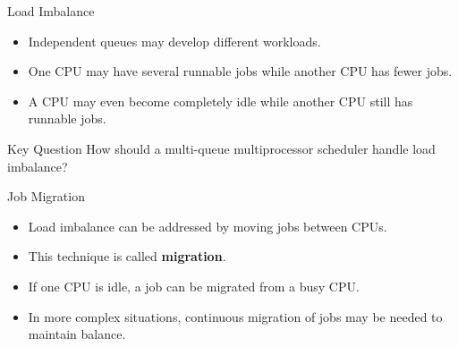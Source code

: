 \begin{frame}{Load Imbalance}

\begin{itemize}
    \item Independent queues may develop different workloads.

    \item One CPU may have several runnable jobs while another CPU has
    fewer jobs.

    \item A CPU may even become completely idle while another CPU still
    has runnable jobs.
\end{itemize}

\vspace{0.3cm}

\begin{block}{Key Question}
How should a multi-queue multiprocessor scheduler handle load imbalance?
\end{block}


\end{frame}

\begin{frame}{Job Migration}

\begin{itemize}
    \item Load imbalance can be addressed by moving jobs between CPUs.

    \item This technique is called \textbf{migration}.

    \item If one CPU is idle, a job can be migrated from a busy CPU.

    \item In more complex situations, continuous migration of jobs may
    be needed to maintain balance.
\end{itemize}


\end{frame}

